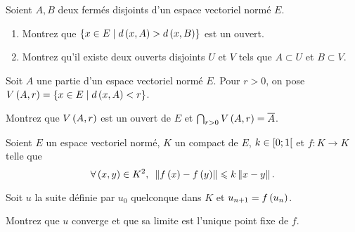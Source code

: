 \begin{corr}
\end{corr}

\begin{exopss}[Exercice 20]
Soient \(A,B\) deux fermés disjoints d'un espace vectoriel normé \(E\).

\begin{enumerate}
    \item Montrez que \(\left\lbrace x\in E\;\middle|\; d\left(x,A\right)>d\left(x,B\right)\right\rbrace\) est un ouvert. \\
    \item Montrez qu'il existe deux ouverts disjoints \(U\) et \(V\) tels que \(A\subset U\) et \(B\subset V\).
\end{enumerate}
\end{exopss}

\begin{corr}
\end{corr}

\begin{exopss}[Exercice 21]
Soit \(A\) une partie d'un espace vectoriel normé \(E\). Pour \(r>0\), on pose \(V\left(A,r\right)=\left\lbrace x\in E\;\middle|\; d\left(x,A\right)<r\right\rbrace\).

Montrez que \(V\left(A,r\right)\) est un ouvert de \(E\) et \(\bigcap_{r>0}V\left(A,r\right)=\overline{A}\).
\end{exopss}

\begin{corr}
\end{corr}

\begin{exopss}[Exercice 22]
Soient \(E\) un espace vectoriel normé, \(K\) un compact de \(E\), \(k\in\left[0;1\right[\) et \(f:K\to K\) telle que \[\quantifs{\forall\paren{x,y}\in K^2}\norme{f\paren{x}-f\paren{y}}\leq k\norme{x-y}.\]

Soit \(u\) la suite définie par \(u_0\) quelconque dans \(K\) et \(u_{n+1}=f\left(u_n\right)\).

Montrez que \(u\) converge et que sa limite est l'unique point fixe de \(f\).
\end{exopss}

\begin{corr}
\end{corr}

